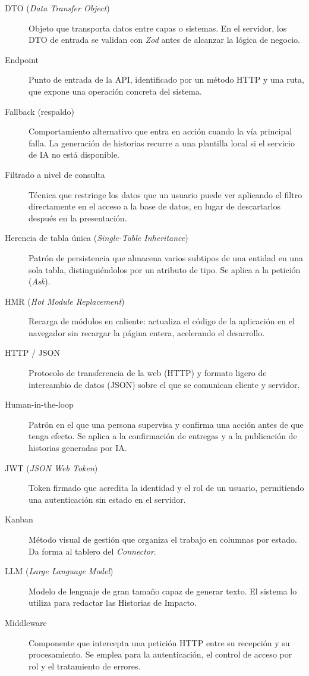 \documentclass[11pt,oneside,spanish,listoffigures,listoftables]{tfgetsinf}
\begin{document}
\begin{description}
  \item[DTO (\textit{Data Transfer Object})] Objeto que transporta datos entre capas o sistemas. En el servidor, los DTO de entrada se validan con \textit{Zod} antes de alcanzar la lógica de negocio.
  \item[Endpoint] Punto de entrada de la API, identificado por un método HTTP y una ruta, que expone una operación concreta del sistema.
  \item[Fallback (respaldo)] Comportamiento alternativo que entra en acción cuando la vía principal falla. La generación de historias recurre a una plantilla local si el servicio de IA no está disponible.
  \item[Filtrado a nivel de consulta] Técnica que restringe los datos que un usuario puede ver aplicando el filtro directamente en el acceso a la base de datos, en lugar de descartarlos después en la presentación.
  \item[Herencia de tabla única (\textit{Single-Table Inheritance})] Patrón de persistencia que almacena varios subtipos de una entidad en una sola tabla, distinguiéndolos por un atributo de tipo. Se aplica a la petición (\textit{Ask}).
  \item[HMR (\textit{Hot Module Replacement})] Recarga de módulos en caliente: actualiza el código de la aplicación en el navegador sin recargar la página entera, acelerando el desarrollo.
  \item[HTTP / JSON] Protocolo de transferencia de la web (HTTP) y formato ligero de intercambio de datos (JSON) sobre el que se comunican cliente y servidor.
  \item[Human-in-the-loop] Patrón en el que una persona supervisa y confirma una acción antes de que tenga efecto. Se aplica a la confirmación de entregas y a la publicación de historias generadas por IA.
  \item[JWT (\textit{JSON Web Token})] Token firmado que acredita la identidad y el rol de un usuario, permitiendo una autenticación sin estado en el servidor.
  \item[Kanban] Método visual de gestión que organiza el trabajo en columnas por estado. Da forma al tablero del \textit{Connector}.
  \item[LLM (\textit{Large Language Model})] Modelo de lenguaje de gran tamaño capaz de generar texto. El sistema lo utiliza para redactar las Historias de Impacto.
  \item[Middleware] Componente que intercepta una petición HTTP entre su recepción y su procesamiento. Se emplea para la autenticación, el control de acceso por rol y el tratamiento de errores.

\end{description}
\end{document}
